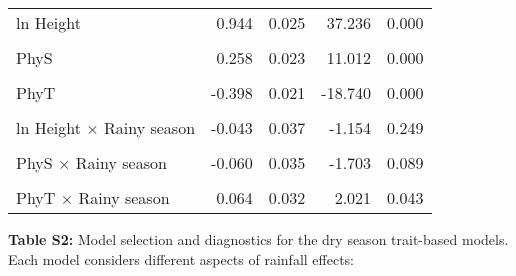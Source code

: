 \documentclass[
  12pt,
  letterpaper,
  DIV=11,
  numbers=noendperiod]{scrartcl}
\begin{document}
\begin{longtable*}[t]{lrrrr}
\hspace{1em}ln Height & 0.944 & 0.025 & 37.236 & 0.000\\
\hspace{1em} &  &  &  & \\
\hspace{1em}PhyS & 0.258 & 0.023 & 11.012 & 0.000\\
\hspace{1em} &  &  &  & \\
\hspace{1em}PhyT & -0.398 & 0.021 & -18.740 & 0.000\\
\hspace{1em} &  &  &  & \\
\hspace{1em}ln Height $\times$ Rainy season & -0.043 & 0.037 & -1.154 & 0.249\\
\hspace{1em} &  &  &  & \\
\hspace{1em}PhyS $\times$ Rainy season & -0.060 & 0.035 & -1.703 & 0.089\\
\hspace{1em} &  &  &  & \\
\hspace{1em}PhyT $\times$ Rainy season & 0.064 & 0.032 & 2.021 & 0.043\\*
\end{longtable*}

\newpage

\textbf{Table S2:} Model selection and diagnostics for the dry season
trait-based models. Each model considers different aspects of rainfall
effects:
\end{document}
